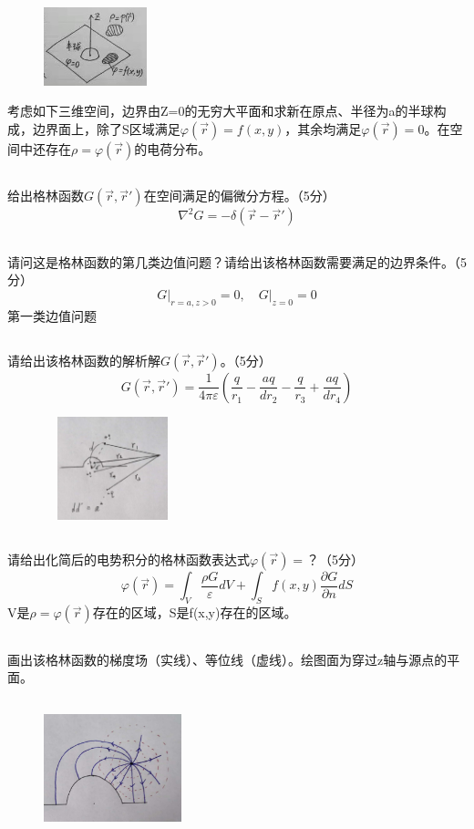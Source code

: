 \documentclass[UTF8]{ctexart}
\begin{document}
\section{}
\begin{figure}
\includegraphics[width=3cm]{2020-4.jpg}
\end{figure}
考虑如下三维空间，边界由Z=0的无穷大平面和求新在原点、半径为a的半球构成，边界面上，除了S区域满足$\varphi(\vec r)=f(x,y)$，其余均满足$\varphi(\vec r)=0$。在空间中还存在$\rho=\varphi(\vec r)$的电荷分布。
\subsection{}
给出格林函数$G(\vec r,\vec r')$在空间满足的偏微分方程。（5分）
\[\nabla^2G=-\delta(\vec r-\vec r')\]
\subsection{}
请问这是格林函数的第几类边值问题？请给出该格林函数需要满足的边界条件。（5分）
\[G\lvert_{r=a,z>0}=0,\quad G\lvert_{z=0}=0\]
第一类边值问题
\subsection{}
请给出该格林函数的解析解$G(\vec r,\vec r')$。（5分）
\[G(\vec r,\vec r')=\frac{1}{4\pi\varepsilon}(\frac{q}{r_1}-\frac{aq}{dr_2}-\frac{q}{r_3}+\frac{aq}{dr_4})\]
\begin{figure}[htbp]
\centering
\includegraphics[width=4cm,height=3cm]{2020-5.jpg}
\end{figure}
\subsection{}
请给出化简后的电势积分的格林函数表达式$\varphi(\vec r)=$？（5分）
\[\varphi(\vec r)=\int_V^{}\frac{\rho G}{\varepsilon}dV+\int_S^{}f(x,y)\frac{\partial G}{\partial n}dS\]
V是$\rho=\varphi(\vec r)$存在的区域，S是f(x,y)存在的区域。
\subsection{}
画出该格林函数的梯度场（实线）、等位线（虚线）。绘图面为穿过z轴与源点的平面。
\begin{figure}[H]
\centering
\includegraphics[width=4cm,height=4cm]{2020-6.jpg}
\end{figure}
\end{document}
